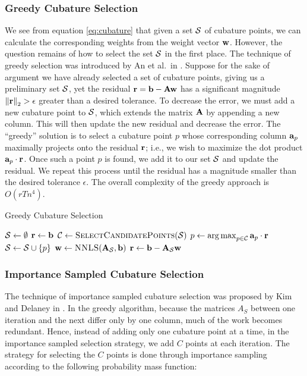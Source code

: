 {\subsubsection{Greedy Cubature Selection}
We see from equation \ref{eq:cubature} that given a set $\mathcal{S}$ of cubature points, we can calculate the corresponding weights from the weight vector $\ww$. However, the question remains of how to select
the set $\mathcal{S}$ in the first place. The technique of greedy selection was introduced by An et al.~in \cite{An:2008}. Suppose for the sake of argument we have already selected a set of cubature points, giving us a preliminary set $\mathcal{S}$, yet the residual $\mathbf{r} = \mathbf{b} - \mathbf{A} \mathbf{w}$ has a significant
magnitude $\left \lVert \mathbf{r} \right \rVert_2 > \epsilon$ greater than a desired tolerance. To decrease the error, we must add a new cubature point to $\mathcal{S}$, which extends the matrix $\mathbf{A}$ by appending a new column.
This will then update the new residual and decrease the error. The ``greedy'' solution is to select a cubature point $p$ whose corresponding column $\mathbf{a}_p$ maximally projects onto the residual $\mathbf{r}$; i.e., we
wish to maximize the dot product $\mathbf{a}_p \cdot \mathbf{r}$. Once such a point $p$ is found, we add it to our set $\mathcal{S}$ and update the residual. We repeat this process until the residual has a magnitude smaller than
the desired tolerance $\epsilon$. The overall complexity of the greedy approach is $O(rTn^4)$.

\begin{algorithm}
\caption{Greedy Cubature Selection}
\begin{algorithmic}[1]
\State $\mathcal{S} \gets \emptyset$
\State $\mathbf{r} \gets \mathbf{b}$
\State $\fancyC \gets \Call{SelectCandidatePoints}{\fancyS}$
\State $p \gets \operatorname*{arg\,max}_{p \in \mathcal{C}} {\mathbf{a}_p \cdot \mathbf{r}}$
\State $\mathcal{S} \gets \mathcal{S} \cup \{p\}$
\State $\ww \gets \Call{NNLS}{\boldA_{\fancyS},\bb}$
\State $\mathbf{r} \gets \mathbf{b} - \mathbf{A}_{\mathcal{S}} \mathbf{w}$
\EndWhile
\Return{$(\fancyS$, $\ww$)}
\EndFunction
\end{algorithmic}
\label{alg:greedy}
\end{algorithm}

\subsubsection{Importance Sampled Cubature Selection}
The technique of importance sampled cubature selection was proposed by Kim and Delaney in \cite{Kim2013}. In the greedy algorithm, because the matrices $A_S$ between one iteration and the next differ only
by one column, much of the work becomes redundant. Hence, instead of adding only one cubature point at a time, in the importance sampled selection strategy, we add $C$ points at each iteration. The strategy
for selecting the $C$ points is done through importance sampling according to the following probability mass function:

}
